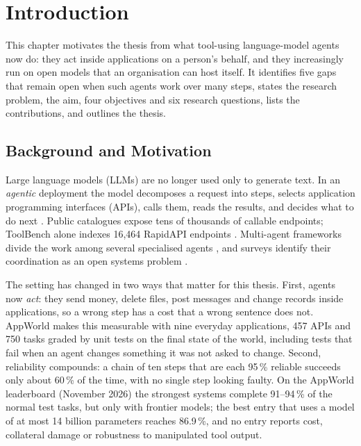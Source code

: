 \chapter{Introduction}
\label{ch:introduction}

\begin{chaptersummary}
This chapter motivates the thesis from what tool-using language-model agents now do: they act inside
applications on a person's behalf, and they increasingly run on open models that an organisation can
host itself. It identifies five gaps that remain open when such agents work over many steps, states the
research problem, the aim, four objectives and six research questions, lists the contributions, and
outlines the thesis.
\end{chaptersummary}

\section{Background and Motivation}
\label{sec:intro-background}

Large language models (LLMs) are no longer used only to generate text. In an \emph{agentic} deployment
the model decomposes a request into steps, selects application programming interfaces (APIs), calls
them, reads the results, and decides what to do next \citep{yao2023react,schick2023toolformer}. Public
catalogues expose tens of thousands of callable endpoints; ToolBench alone indexes 16{,}464 RapidAPI
endpoints \citep{qin2024toolllm}. Multi-agent frameworks divide the work among several specialised
agents \citep{wu2024autogen,hong2024metagpt,qian2024chatdev,li2023camel}, and surveys identify their
coordination as an open systems problem \citep{wang2024survey,guo2024mas}.

The setting has changed in two ways that matter for this thesis. First, agents now \emph{act}: they send
money, delete files, post messages and change records inside applications, so a wrong step has a cost
that a wrong sentence does not. AppWorld \citep{trivedi2024appworld} makes this measurable with nine
everyday applications, 457 APIs and 750 tasks graded by unit tests on the final state of the world,
including tests that fail when an agent changes something it was not asked to change. Second,
reliability compounds: a chain of ten steps that are each 95\,\% reliable succeeds only about 60\,\% of
the time, with no single step looking faulty. On the AppWorld leaderboard (November 2026) the strongest
systems complete 91--94\,\% of the normal test tasks, but only with frontier models; the best entry that
uses a model of at most 14 billion parameters reaches 86.9\,\%, and no entry reports cost, collateral
damage or robustness to manipulated tool output.

